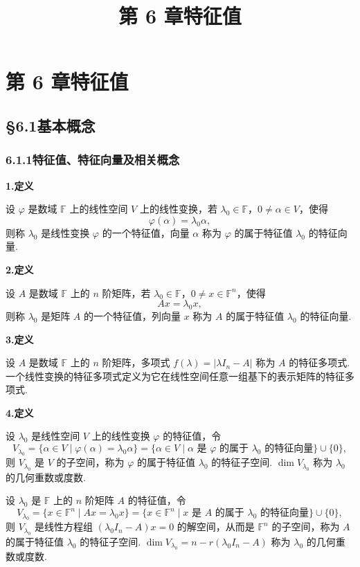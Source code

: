 \documentclass[UTF8,12pt,a4paper,fontset=fandol]{ctexart}
\title{第 6 章\quad 特征值}
\author{}
\date{}
\begin{document}
\maketitle

\section*{第 6 章\quad 特征值}

\subsection*{§6.1\quad 基本概念}

\subsubsection*{6.1.1\quad 特征值、特征向量及相关概念}

\noindent\textbf{1.\quad 定义}

设 $\varphi$ 是数域 $\mathbb{F}$ 上的线性空间 $V$ 上的线性变换，若 $\lambda_0\in\mathbb{F}$，$0\ne \alpha\in V$，使得
\[
\varphi(\alpha)=\lambda_0\alpha,
\]
则称 $\lambda_0$ 是线性变换 $\varphi$ 的一个特征值，向量 $\alpha$ 称为 $\varphi$ 的属于特征值 $\lambda_0$ 的特征向量.

\noindent\textbf{2.\quad 定义}

设 $A$ 是数域 $\mathbb{F}$ 上的 $n$ 阶矩阵，若 $\lambda_0\in\mathbb{F}$，$0\ne x\in\mathbb{F}^n$，使得
\[
Ax=\lambda_0x,
\]
则称 $\lambda_0$ 是矩阵 $A$ 的一个特征值，列向量 $x$ 称为 $A$ 的属于特征值 $\lambda_0$ 的特征向量.

\noindent\textbf{3.\quad 定义}

设 $A$ 是数域 $\mathbb{F}$ 上的 $n$ 阶矩阵，多项式 $f(\lambda)=|\lambda I_n-A|$ 称为 $A$ 的特征多项式. 一个线性变换的特征多项式定义为它在线性空间任意一组基下的表示矩阵的特征多项式.

\noindent\textbf{4.\quad 定义}

设 $\lambda_0$ 是线性空间 $V$ 上的线性变换 $\varphi$ 的特征值，令
\[
V_{\lambda_0}=\{\alpha\in V\mid \varphi(\alpha)=\lambda_0\alpha\}
=\{\alpha\in V\mid \alpha\text{ 是 }\varphi\text{ 的属于 }\lambda_0\text{ 的特征向量}\}\cup\{0\},
\]
则 $V_{\lambda_0}$ 是 $V$ 的子空间，称为 $\varphi$ 的属于特征值 $\lambda_0$ 的特征子空间. $\dim V_{\lambda_0}$ 称为 $\lambda_0$ 的几何重数或度数.

设 $\lambda_0$ 是 $\mathbb{F}$ 上的 $n$ 阶矩阵 $A$ 的特征值，令
\[
V_{\lambda_0}=\{x\in\mathbb{F}^n\mid Ax=\lambda_0x\}
=\{x\in\mathbb{F}^n\mid x\text{ 是 }A\text{ 的属于 }\lambda_0\text{ 的特征向量}\}\cup\{0\},
\]
则 $V_{\lambda_0}$ 是线性方程组 $(\lambda_0I_n-A)x=0$ 的解空间，从而是 $\mathbb{F}^n$ 的子空间，称为 $A$ 的属于特征值 $\lambda_0$ 的特征子空间. $\dim V_{\lambda_0}=n-r(\lambda_0I_n-A)$ 称为 $\lambda_0$ 的几何重数或度数.
\end{document}
